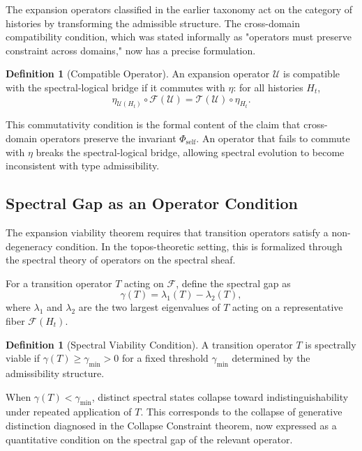 \documentclass[12pt, a4paper]{article}
\theoremstyle{plain}
\theoremstyle{definition}
\newtheorem{definition}[theorem]{Definition}
\theoremstyle{remark}
\begin{document}
The expansion operators classified in the earlier taxonomy act on the category of histories by transforming the admissible structure. The cross-domain compatibility condition, which was stated informally as "operators must preserve constraint across domains," now has a precise formulation.

\begin{definition}[Compatible Operator]
An expansion operator $\mathcal{U}$ is compatible with the spectral-logical bridge if it commutes with $\eta$: for all histories $H_t$,
\[
\eta_{\mathcal{U}(H_t)} \circ \mathcal{F}(\mathcal{U}) = \mathcal{T}(\mathcal{U}) \circ \eta_{H_t}.
\]
\end{definition}

This commutativity condition is the formal content of the claim that cross-domain operators preserve the invariant $\Phi_{\mathrm{self}}$. An operator that fails to commute with $\eta$ breaks the spectral-logical bridge, allowing spectral evolution to become inconsistent with type admissibility.

\subsection{Spectral Gap as an Operator Condition}

The expansion viability theorem requires that transition operators satisfy a non-degeneracy condition. In the topos-theoretic setting, this is formalized through the spectral theory of operators on the spectral sheaf.

For a transition operator $T$ acting on $\mathcal{F}$, define the spectral gap as
\[
\gamma(T) = \lambda_1(T) - \lambda_2(T),
\]
where $\lambda_1$ and $\lambda_2$ are the two largest eigenvalues of $T$ acting on a representative fiber $\mathcal{F}(H_t)$.

\begin{definition}[Spectral Viability Condition]
A transition operator $T$ is spectrally viable if $\gamma(T) \geq \gamma_{\min} > 0$ for a fixed threshold $\gamma_{\min}$ determined by the admissibility structure.
\end{definition}

When $\gamma(T) < \gamma_{\min}$, distinct spectral states collapse toward indistinguishability under repeated application of $T$. This corresponds to the collapse of generative distinction diagnosed in the Collapse Constraint theorem, now expressed as a quantitative condition on the spectral gap of the relevant operator.
\end{document}
